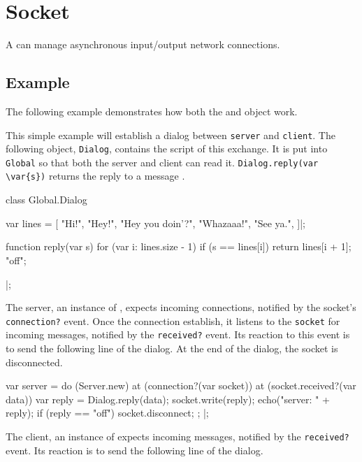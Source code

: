 \section{Socket}

A  can manage asynchronous input/output network
connections.

\subsection{Example}

The following example demonstrates how both the  and
 object work.

This simple example will establish a dialog between
\lstinline|server| and \lstinline|client|.  The following object,
\lstinline|Dialog|, contains the script of this exchange.  It is put
into \lstinline|Global| so that both the server and client can read
it.  \lstinline|Dialog.reply(var \var{s})| returns the reply to a
message .

\begin{urbiscript}
class Global.Dialog
{
  var lines =
  [
    "Hi!",
    "Hey!",
    "Hey you doin'?",
    "Whazaaa!",
    "See ya.",
  ]|;

  function reply(var s)
  {
    for (var i: lines.size - 1)
      if (s == lines[i])
        return lines[i + 1];
    "off";
  }
}|;
\end{urbiscript}

The server, an instance of , expects incoming
connections, notified by the socket's \lstinline|connection?| event.
Once the connection establish, it listens to the \lstinline|socket|
for incoming messages, notified by the \lstinline|received?| event.
Its reaction to this event is to send the following line of the
dialog.  At the end of the dialog, the socket is disconnected.

\begin{urbiscript}
var server =
  do (Server.new)
  {
    at (connection?(var socket))
      at (socket.received?(var data))
      {
        var reply = Dialog.reply(data);
        socket.write(reply);
        echo("server: " + reply);
        if (reply == "off")
          socket.disconnect;
      };
  }|;
\end{urbiscript}

The client, an instance of  expects incoming
messages, notified by the \lstinline|received?| event.  Its reaction
is to send the following line of the dialog.

